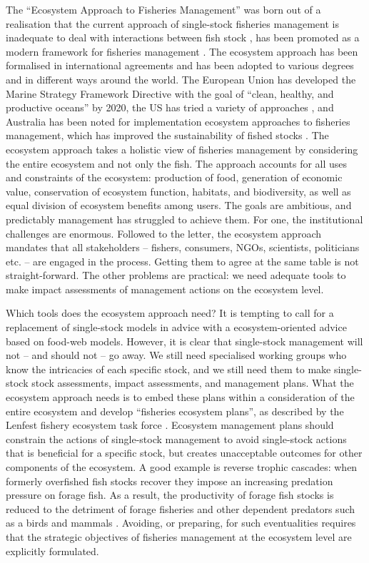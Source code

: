 The ``Ecosystem Approach to Fisheries Management''  was born out of a realisation that the current approach of single-stock fisheries management is inadequate to deal with interactions between fish stock \citep{May1979}, has been promoted as a modern framework for fisheries management \citep{}.  The ecosystem approach has been formalised in international agreements \citep{FAO2003} and has been adopted to various degrees and in different ways around the world.  The European Union has developed the Marine Strategy Framework Directive with the goal of ``clean, healthy, and productive oceans'' by 2020, the US has tried a variety of approaches \citep{Essington2016}, and Australia has been noted for implementation ecosystem approaches to fisheries management, which has improved the sustainability of fished stocks \citep{Smith2007b}.  The ecosystem approach takes a holistic view of fisheries management by considering the entire ecosystem and not only the fish.  The approach accounts for all uses and constraints of the ecosystem: production of food, generation of economic value, conservation of ecosystem function, habitats, and biodiversity, as well as equal division of ecosystem benefits among users.  The goals are ambitious, and predictably management has struggled to achieve them.  For one, the institutional challenges are enormous.  Followed to the letter, the ecosystem approach mandates that all stakeholders -- fishers, consumers, NGOs, scientists, politicians etc. -- are engaged in the process.  Getting them to agree at the same table is not straight-forward.  The other problems are practical: we need adequate tools to make impact assessments of management actions on the ecosystem level.

Which tools does the ecosystem approach need?  It is tempting to call for a replacement of single-stock models in advice with a ecosystem-oriented advice based on food-web models.  However, it is clear that  single-stock management will not -- and should not -- go away.  We still need specialised working groups who know the intricacies of each specific stock, and we still need them to make single-stock stock assessments, impact assessments, and management plans.  What the ecosystem approach needs is to embed these plans within a consideration of the entire ecosystem and develop ``fisheries ecosystem plans'', as described by the Lenfest fishery ecosystem task force \citep{Essington2016}.   Ecosystem management plans should constrain the actions of single-stock management to avoid single-stock actions that is beneficial for a specific stock, but creates unacceptable outcomes for other components of the ecosystem.  A good example is reverse trophic cascades:  when formerly overfished fish stocks recover they impose an increasing predation pressure on forage fish.  As a result, the productivity of forage fish stocks is reduced to the detriment of forage fisheries and other dependent predators such as a birds and mammals \citep{vanGemert2018}.  Avoiding, or preparing, for such eventualities requires that the strategic objectives of fisheries management at the ecosystem level are explicitly formulated.  

